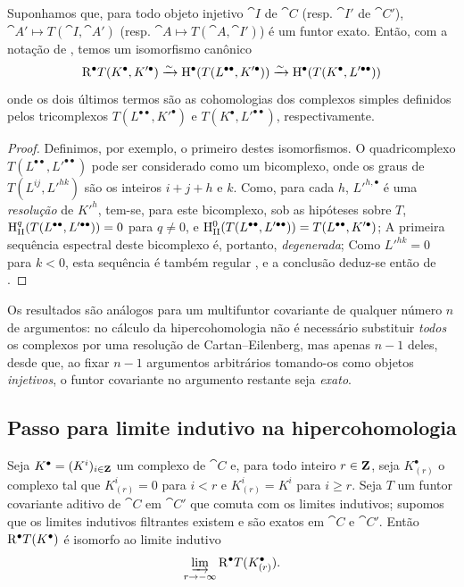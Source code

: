\begin{proposition}[11.4.7]
\label{0.11.4.7}
Suponhamos que, para todo objeto injetivo $\cat{I}$ de $\cat{C}$ (resp. $\cat{I'}$ de $\cat{C}'$), $\cat{A'}\mapsto T(\cat{I}, \cat{A'})$ (resp. $\cat{A}\mapsto T(\cat{A}, \cat{I'})$) é um funtor exato.
Então, com a notação de , temos um isomorfismo canônico
\[
  \mathrm{R}^\bullet T(K^\bullet, K'^\bullet) \xrightarrow{\sim} \mathrm{H}^\bullet(T(L^{\bullet\bullet}, K'^\bullet)) \xrightarrow{\sim} \mathrm{H}^\bullet(T(K^\bullet, L'^{\bullet\bullet})) 
\]
onde os dois últimos termos são as cohomologias dos complexos simples definidos pelos tricomplexos $T(L^{\bullet\bullet}, K'^\bullet)$ e $T(K^\bullet, L'^{\bullet\bullet})$, respectivamente.
\end{proposition}

\begin{proof}
Definimos, por exemplo, o primeiro destes isomorfismos.
O quadricomplexo $T(L^{\bullet\bullet}, L'^{\bullet\bullet})$ pode ser considerado como um bicomplexo, onde os graus de $T(L^{ij}, L'^{hk})$ são os inteiros $i+j+h$ e $k$.
Como, para cada $h$, ${L'}^{h,\bullet}$ é uma \emph{resolução} de ${K'}^h$, tem-se, para este bicomplexo, sob as hipóteses sobre $T$, $\mathrm{H}_\mathrm{II}^q(T(L^{\bullet\bullet}, L'^{\bullet\bullet}))=0$ para $q\neq 0$, e $\mathrm{H}_\mathrm{II}^0(T(L^{\bullet\bullet}, L'^{\bullet\bullet})) = T(L^{\bullet\bullet}, K'^\bullet)$;
A primeira sequência espectral deste bicomplexo é, portanto, \emph{degenerada};
Como $L'^{hk}=0$ para $k<0$, esta sequência é também regular , e a conclusão deduz-se então de .
\end{proof}

Os resultados são análogos para um multifuntor covariante de qualquer número $n$ de argumentos: no cálculo da hipercohomologia não é necessário substituir \emph{todos} os complexos
por uma resolução de Cartan--Eilenberg, mas apenas $n-1$ deles, desde que, ao fixar $n-1$ argumentos arbitrários tomando-os como objetos \emph{injetivos}, o funtor covariante no argumento restante seja \emph{exato}.


\subsection{Passo para limite indutivo na hipercohomologia}
\label{subsection:0.11.5}

\begin{lemma}[11.5.1]
\label{0.11.5.1}
Seja $K^\bullet=(K^i)_{i\in\mathbf{Z}}$ um complexo de $\cat{C}$ e, para todo inteiro $r\in\mathbf{Z}$, seja $K^\bullet_{(r)}$ o complexo tal que $K^i_{(r)}=0$ para $i<r$ e $K^i_{(r)}=K^i$ para $i\geq r$.
Seja $T$ um funtor covariante aditivo
de $\cat{C}$ em $\cat{C}'$ que comuta com os limites indutivos; supomos que os limites indutivos filtrantes existem e são exatos em $\cat{C}$ e $\cat{C}'$.
Então $\mathrm{R}^\bullet T(K^\bullet)$ é isomorfo ao limite indutivo
\[
  \varinjlim_{r\to-\infty}\RR^\bullet T(K^\bullet_{(r)}).
\]
\end{lemma}

